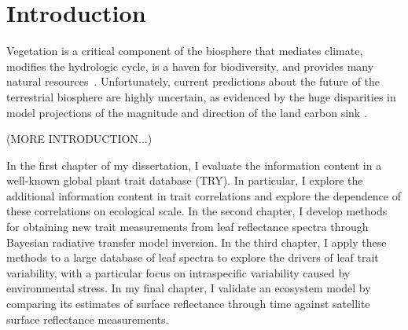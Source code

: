 \chapter{Introduction}
\label{chapter:Introduction}
\thispagestyle{myheadings}

Vegetation is a critical component of the biosphere that mediates climate, modifies the hydrologic cycle, is a haven for biodiversity, and provides many natural resources~\cite{bonan_forests_2008}.
Unfortunately, current predictions about the future of the terrestrial biosphere are highly uncertain, as evidenced by the huge disparities in model projections of the magnitude and direction of the land carbon sink \cite{friedlingstein_uncertainties_2014}.

(MORE INTRODUCTION...)

In the first chapter of my dissertation, I evaluate the information content in a well-known global plant trait database (TRY).
In particular, I explore the additional information content in trait correlations and explore the dependence of these correlations on ecological scale.
In the second chapter, I develop methods for obtaining new trait measurements from leaf reflectance spectra through Bayesian radiative transfer model inversion.
In the third chapter, I apply these methods to a large database of leaf spectra to explore the drivers of leaf trait variability, with a particular focus on intraspecific variability caused by environmental stress.
In my final chapter, I validate an ecosystem model by comparing its estimates of surface reflectance through time against satellite surface reflectance measurements.
